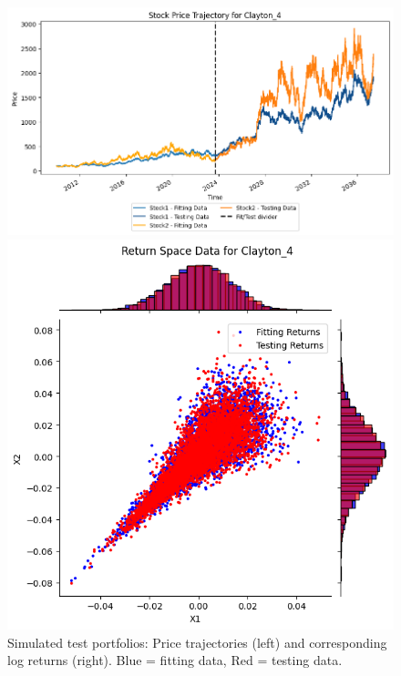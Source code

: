 \begin{figure}
\begin{minipage}{0.9\textwidth}
\begin{minipage}{0.34\textwidth}
        \end{minipage}
    \end{minipage}
    \hfill
    \begin{minipage}{0.9\textwidth}
        \centering
        \begin{minipage}{0.54\textwidth}
            \centering
            \includegraphics[width=\textwidth]{4Method/pictures/PricesClayton_4.png}
        \end{minipage}
        \hfill
        \begin{minipage}{0.34\textwidth}
            \centering
            \includegraphics[width=\textwidth]{4Method/pictures/ReturnsClayton_4.png}
        \end{minipage}
    \end{minipage}
    \caption{Simulated test portfolios: Price trajectories (left) and corresponding log returns (right). Blue = fitting data, Red = testing data.}
    \label{fig:DatasetsUsed}
\end{figure}

